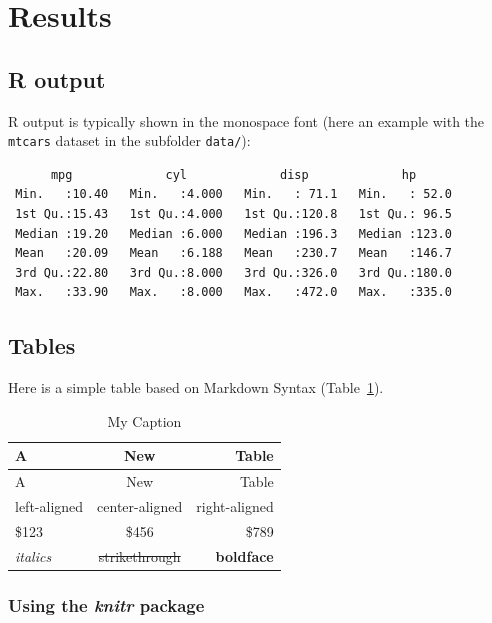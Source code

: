 \documentclass[
  letterpaper,
  DIV=11,
  numbers=noendperiod]{scrartcl}
\begin{document}
\section{Results}\label{results}

\subsection{R output}\label{r-output}

R output is typically shown in the monospace font (here an example with
the \texttt{mtcars} dataset in the subfolder \texttt{data/}):

\begin{verbatim}
      mpg             cyl             disp             hp       
 Min.   :10.40   Min.   :4.000   Min.   : 71.1   Min.   : 52.0  
 1st Qu.:15.43   1st Qu.:4.000   1st Qu.:120.8   1st Qu.: 96.5  
 Median :19.20   Median :6.000   Median :196.3   Median :123.0  
 Mean   :20.09   Mean   :6.188   Mean   :230.7   Mean   :146.7  
 3rd Qu.:22.80   3rd Qu.:8.000   3rd Qu.:326.0   3rd Qu.:180.0  
 Max.   :33.90   Max.   :8.000   Max.   :472.0   Max.   :335.0  
\end{verbatim}

\subsection{Tables}\label{sec-tables}

Here is a simple table based on Markdown Syntax
(Table~\ref{tbl-markdown}).

\begin{longtable}[]{@{}lcr@{}}
\caption{My Caption}\label{tbl-markdown}\tabularnewline
\toprule\noalign{}
A & New & Table \\
\midrule\noalign{}
\endfirsthead
\toprule\noalign{}
A & New & Table \\
\midrule\noalign{}
\endhead
\bottomrule\noalign{}
\endlastfoot
left-aligned & center-aligned & right-aligned \\
\$123 & \$456 & \$789 \\
\emph{italics} & \st{strikethrough} & \textbf{boldface} \\
\end{longtable}

\subsubsection{\texorpdfstring{Using the \emph{knitr}
package}{Using the knitr package}}\label{using-the-knitr-package}
\end{document}

